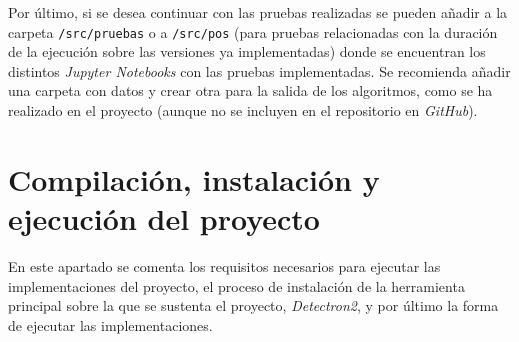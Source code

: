 Por último, si se desea continuar con las pruebas realizadas se pueden añadir a la carpeta \texttt{/src/pruebas} o a \texttt{/src/pos} (para pruebas relacionadas con la duración de la ejecución sobre las versiones ya implementadas) donde se encuentran los distintos \textit{Jupyter Notebooks} con las pruebas implementadas. Se recomienda añadir una carpeta con datos y crear otra para la salida de los algoritmos, como se ha realizado en el proyecto (aunque no se incluyen en el repositorio en \textit{GitHub}).

\section{Compilación, instalación y ejecución del proyecto}
En este apartado se comenta los requisitos necesarios para ejecutar las implementaciones del proyecto, el proceso de instalación de la herramienta principal sobre la que se sustenta el proyecto, \textit{Detectron2}, y por último la forma de ejecutar las implementaciones.

